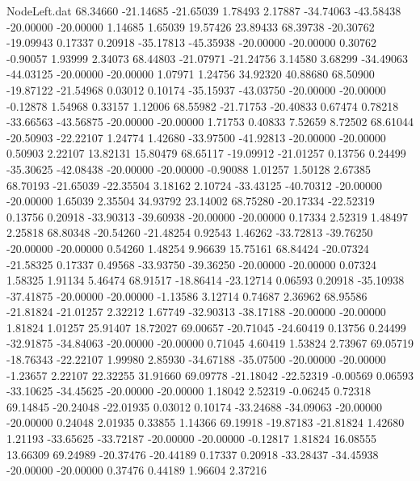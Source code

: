 \begin{filecontents}{NodeLeft.dat}
  68.34660  -21.14685  -21.65039     1.78493    2.17887  -34.74063  -43.58438  -20.00000  -20.00000    1.14685    1.65039   19.57426   23.89433
  68.39738  -20.30762  -19.09943     0.17337    0.20918  -35.17813  -45.35938  -20.00000  -20.00000    0.30762   -0.90057    1.93999    2.34073
  68.44803  -21.07971  -21.24756     3.14580    3.68299  -34.49063  -44.03125  -20.00000  -20.00000    1.07971    1.24756   34.92320   40.88680
  68.50900  -19.87122  -21.54968     0.03012    0.10174  -35.15937  -43.03750  -20.00000  -20.00000   -0.12878    1.54968    0.33157    1.12006
  68.55982  -21.71753  -20.40833     0.67474    0.78218  -33.66563  -43.56875  -20.00000  -20.00000    1.71753    0.40833    7.52659    8.72502
  68.61044  -20.50903  -22.22107     1.24774    1.42680  -33.97500  -41.92813  -20.00000  -20.00000    0.50903    2.22107   13.82131   15.80479
  68.65117  -19.09912  -21.01257     0.13756    0.24499  -35.30625  -42.08438  -20.00000  -20.00000   -0.90088    1.01257    1.50128    2.67385
  68.70193  -21.65039  -22.35504     3.18162    2.10724  -33.43125  -40.70312  -20.00000  -20.00000    1.65039    2.35504   34.93792   23.14002
  68.75280  -20.17334  -22.52319     0.13756    0.20918  -33.90313  -39.60938  -20.00000  -20.00000    0.17334    2.52319    1.48497    2.25818
  68.80348  -20.54260  -21.48254     0.92543    1.46262  -33.72813  -39.76250  -20.00000  -20.00000    0.54260    1.48254    9.96639   15.75161
  68.84424  -20.07324  -21.58325     0.17337    0.49568  -33.93750  -39.36250  -20.00000  -20.00000    0.07324    1.58325    1.91134    5.46474
  68.91517  -18.86414  -23.12714     0.06593    0.20918  -35.10938  -37.41875  -20.00000  -20.00000   -1.13586    3.12714    0.74687    2.36962
  68.95586  -21.81824  -21.01257     2.32212    1.67749  -32.90313  -38.17188  -20.00000  -20.00000    1.81824    1.01257   25.91407   18.72027
  69.00657  -20.71045  -24.60419     0.13756    0.24499  -32.91875  -34.84063  -20.00000  -20.00000    0.71045    4.60419    1.53824    2.73967
  69.05719  -18.76343  -22.22107     1.99980    2.85930  -34.67188  -35.07500  -20.00000  -20.00000   -1.23657    2.22107   22.32255   31.91660
  69.09778  -21.18042  -22.52319    -0.00569    0.06593  -33.10625  -34.45625  -20.00000  -20.00000    1.18042    2.52319   -0.06245    0.72318
  69.14845  -20.24048  -22.01935     0.03012    0.10174  -33.24688  -34.09063  -20.00000  -20.00000    0.24048    2.01935    0.33855    1.14366
  69.19918  -19.87183  -21.81824     1.42680    1.21193  -33.65625  -33.72187  -20.00000  -20.00000   -0.12817    1.81824   16.08555   13.66309
  69.24989  -20.37476  -20.44189     0.17337    0.20918  -33.28437  -34.45938  -20.00000  -20.00000    0.37476    0.44189    1.96604    2.37216

\end{filecontents}

